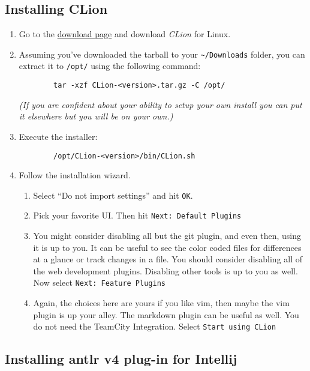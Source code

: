 \documentclass{article}
\begin{document}
\subsection{Installing CLion}
\begin{enumerate}
	\item
    Go to the \href{https://www.jetbrains.com/clion/download/\#section=linux} {download page} and
    download \textit{CLion} for Linux.
	\item
    Assuming you've downloaded the tarball to your \lstinline{~/Downloads} folder, you can extract
    it to \lstinline{/opt/} using the following command:
  	\begin{lstlisting}
  		tar -xzf CLion-<version>.tar.gz -C /opt/
  	\end{lstlisting}
  	\textit{(If you are confident about your ability to setup your own install you can put it
    elsewhere but you will be on your own.)}
	\item
    Execute the installer:
  	\begin{lstlisting}
  		/opt/CLion-<version>/bin/CLion.sh
  	\end{lstlisting}
	\item
    Follow the installation wizard.
  	\begin{enumerate}
  		\item
        Select ``Do not import settings'' and hit \texttt{OK}.
  		\item
        Pick your favorite UI. Then hit \texttt{Next: Default Plugins}
  		\item
        You might consider disabling all but the git plugin, and even then, using it is up to you.
        It can be useful to see the color coded files for differences at a glance or track changes
        in a file. You should consider disabling all of the web development plugins. Disabling
        other tools is up to you as well. Now select \texttt{Next: Feature Plugins}
  		\item
        Again, the choices here are yours if you like vim, then maybe the vim plugin is up your
        alley. The markdown plugin can be useful as well. You do not need the TeamCity Integration.
        Select \texttt{Start using CLion}
  	\end{enumerate}
\end{enumerate}
	\subsection{Installing antlr v4 plug-in for Intellij}
\end{document}

